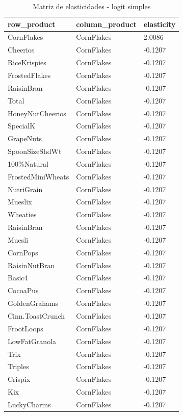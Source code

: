 \begin{table}[!htbp]
\centering
\caption{Matriz de elasticidades - logit simples}
\label{tab:elas-simple}
\scriptsize
\begin{tabular}{lll}
\hline
row\_product & column\_product & elasticity
\\
\hline
CornFlakes & CornFlakes & 2.0086
\\
Cheerios & CornFlakes & -0.1207
\\
RiceKrispies & CornFlakes & -0.1207
\\
FrostedFlakes & CornFlakes & -0.1207
\\
RaisinBran & CornFlakes & -0.1207
\\
Total & CornFlakes & -0.1207
\\
HoneyNutCheerios & CornFlakes & -0.1207
\\
SpecialK & CornFlakes & -0.1207
\\
GrapeNuts & CornFlakes & -0.1207
\\
SpoonSizeShdWt & CornFlakes & -0.1207
\\
100\%Natural & CornFlakes & -0.1207
\\
FrostedMiniWheats & CornFlakes & -0.1207
\\
NutriGrain & CornFlakes & -0.1207
\\
Mueslix & CornFlakes & -0.1207
\\
Wheaties & CornFlakes & -0.1207
\\
RaisinBran & CornFlakes & -0.1207
\\
Muesli & CornFlakes & -0.1207
\\
CornPops & CornFlakes & -0.1207
\\
RaisinNutBran & CornFlakes & -0.1207
\\
Basic4 & CornFlakes & -0.1207
\\
CocoaPus & CornFlakes & -0.1207
\\
GoldenGrahams & CornFlakes & -0.1207
\\
Cinn.ToastCrunch & CornFlakes & -0.1207
\\
FrootLoops & CornFlakes & -0.1207
\\
LowFatGranola & CornFlakes & -0.1207
\\
Trix & CornFlakes & -0.1207
\\
Triples & CornFlakes & -0.1207
\\
Crispix & CornFlakes & -0.1207
\\
Kix & CornFlakes & -0.1207
\\
LuckyCharms & CornFlakes & -0.1207
\\

\end{tabular}
\end{table}
